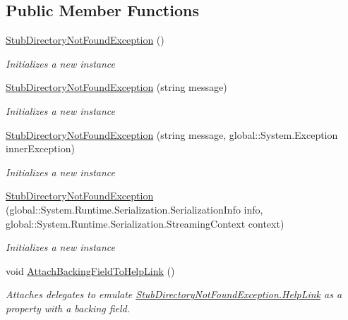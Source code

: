 \subsection*{Public Member Functions}
\begin{DoxyCompactItemize}
\item 
\hyperlink{class_system_1_1_i_o_1_1_fakes_1_1_stub_directory_not_found_exception_a1dde5ddfc81c273c17343e46fcc6ab0a}{Stub\-Directory\-Not\-Found\-Exception} ()
\begin{DoxyCompactList}\small\item\em Initializes a new instance\end{DoxyCompactList}\item 
\hyperlink{class_system_1_1_i_o_1_1_fakes_1_1_stub_directory_not_found_exception_a5dc93fbb24ac388c932de86fb5fe0fca}{Stub\-Directory\-Not\-Found\-Exception} (string message)
\begin{DoxyCompactList}\small\item\em Initializes a new instance\end{DoxyCompactList}\item 
\hyperlink{class_system_1_1_i_o_1_1_fakes_1_1_stub_directory_not_found_exception_a86c5438656482cc8a0236e1971d5a914}{Stub\-Directory\-Not\-Found\-Exception} (string message, global\-::\-System.\-Exception inner\-Exception)
\begin{DoxyCompactList}\small\item\em Initializes a new instance\end{DoxyCompactList}\item 
\hyperlink{class_system_1_1_i_o_1_1_fakes_1_1_stub_directory_not_found_exception_aec3413377e26457630348f655a8cbdff}{Stub\-Directory\-Not\-Found\-Exception} (global\-::\-System.\-Runtime.\-Serialization.\-Serialization\-Info info, global\-::\-System.\-Runtime.\-Serialization.\-Streaming\-Context context)
\begin{DoxyCompactList}\small\item\em Initializes a new instance\end{DoxyCompactList}\item 
void \hyperlink{class_system_1_1_i_o_1_1_fakes_1_1_stub_directory_not_found_exception_ab63b0f2837192b7e25db1768d1d536d5}{Attach\-Backing\-Field\-To\-Help\-Link} ()
\begin{DoxyCompactList}\small\item\em Attaches delegates to emulate \hyperlink{class_system_1_1_i_o_1_1_fakes_1_1_stub_directory_not_found_exception_a4431b38b6921f0ccd7b1cd85c6ac89be}{Stub\-Directory\-Not\-Found\-Exception.\-Help\-Link} as a property with a backing field.\end{DoxyCompactList}\item 

\end{DoxyCompactItemize}
